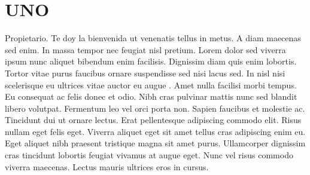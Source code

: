 \section{UNO}
    Propietario. Te doy la bienvenida ut venenatis tellus in metus. A diam maecenas sed enim. In massa tempor nec feugiat nisl pretium. Lorem
    dolor sed viverra ipsum nunc aliquet bibendum enim facilisis. Dignissim diam quis enim lobortis. Tortor vitae
    purus faucibus ornare suspendisse sed nisi lacus sed. In nisl nisi scelerisque eu ultrices vitae auctor eu augue
    . Amet nulla facilisi morbi tempus. Eu consequat ac felis donec et odio. Nibh cras pulvinar mattis nunc sed
    blandit libero volutpat. Fermentum leo vel orci porta non. Sapien faucibus et molestie ac. Tincidunt dui ut
    ornare lectus. Erat pellentesque adipiscing commodo elit. Risus nullam eget felis eget. Viverra aliquet eget sit
    amet tellus cras adipiscing enim eu. Eget aliquet nibh praesent tristique magna sit amet purus. Ullamcorper
    dignissim cras tincidunt lobortis feugiat vivamus at augue eget. Nunc vel risus commodo viverra maecenas. Lectus
    mauris ultrices eros in cursus.
